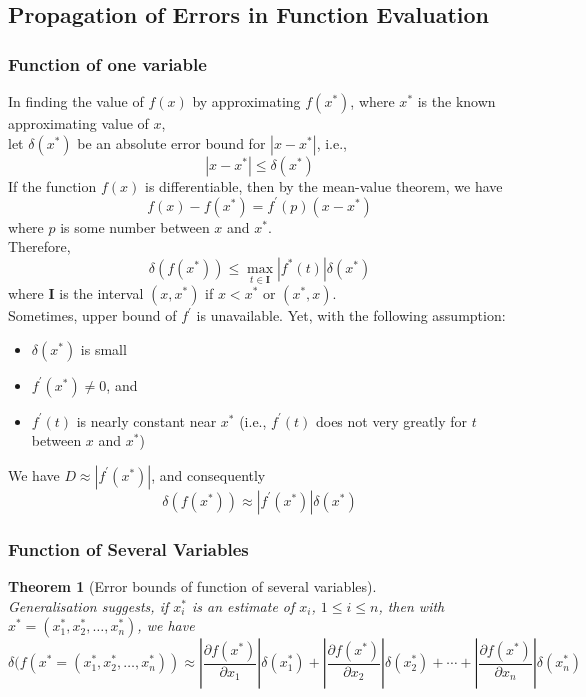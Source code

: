 \documentclass[12pt]{article}
\newtheorem{theorem}{Theorem}[section]
\theoremstyle{definition}
\begin{document}
\subsection{Propagation of Errors in Function Evaluation}
\subsubsection{Function of one variable}
In finding the value of $f(x)$ by approximating $f(x^\ast)$, where $x^\ast$ is the known approximating value of $x$,\\let $\delta(x^\ast)$ be an absolute error bound for $|x-x^\ast|$, i.e.,
\[
|x-x^\ast|\leq \delta(x^\ast)
\]
If the function $f(x)$ is differentiable, then by the mean-value theorem, we have
\[
f(x)-f(x^\ast)=f^\prime(p)(x-x^\ast)
\]
where $p$ is some number between $x$ and $x^\ast$.\\
Therefore, 
\[
\delta(f(x^\ast))\leq \max_{t\in\mathbf{I}}|f^\ast(t)|\delta(x^\ast)
\]
where $\mathbf{I}$ is the interval $(x,x^\ast)$ if $x<x^\ast$ or $(x^\ast,x)$.\\
Sometimes, upper bound of $f^\prime$ is unavailable. Yet, with the following assumption:
\begin{itemize}
  \item $\delta(x^\ast)$ is small
  \item $f^\prime(x^\ast)\neq 0$, and
  \item $f^\prime(t)$ is nearly constant  near $x^\ast$ (i.e., $f^\prime(t)$ does not very greatly for $t$ between $x$ and $x^\ast$)
\end{itemize}
We have $D\approx |f^\prime(x^\ast)|$, and consequently
\[
\delta(f(x^\ast))\approx|f^\prime(x^\ast)|\delta(x^\ast)
\]
\subsubsection{Function of Several Variables}
\begin{theorem}[Error bounds of function of several variables]
\hfill\\\normalfont
Generalisation suggests, if $x_i^\ast$ is an estimate of $x_i$, $1\leq i\leq n$, then with $x^\ast=(x_1^\ast,x_2^\ast,\ldots,x_n^\ast)$, we have
\[
\delta(f(x^\ast=(x_1^\ast,x_2^\ast,\ldots,x_n^\ast))\approx\left\lvert\frac{\partial f(x^\ast)}{\partial x_1}\right\rvert \delta(x_1^\ast)+\left\lvert\frac{\partial f(x^\ast)}{\partial x_2}\right\rvert \delta(x_2^\ast)+\cdots+\left\lvert\frac{\partial f(x^\ast)}{\partial x_n}\right\rvert \delta(x_n^\ast)
\]
\end{theorem}
\end{document}
